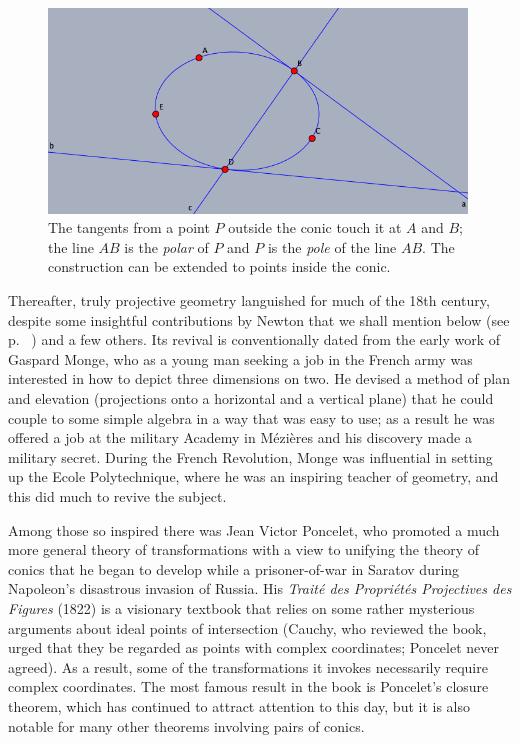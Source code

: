 \bigskip
\begin{center}
    \begin{figure}
   \begin{center}  \includegraphics[width=30em]{poleandpolar.png} 
   \end{center}
     \protect \caption{The tangents from a point $P$ outside the conic touch it at $A$ and $B$; the line $AB$ is the \emph{polar} of $P$ and $P$ is the \emph{pole} of the line $AB$. The construction can be extended to points inside the conic.}
      \label{figpolepolar}
     \end{figure}
\end{center}

\bigskip 


Thereafter, truly projective geometry languished for much of the 18th century, despite some insightful contributions by Newton that we shall mention below (see p. ~\pageref{Newtonconics}) and a few others. Its revival is conventionally dated from the early work of Gaspard Monge, who as a young man seeking a job in the French army was  interested in how to depict three dimensions on two. He devised a method of plan and elevation (projections onto a horizontal and a vertical plane) that he could couple to some simple algebra in a way that was easy to use; as a result he was offered a job at the military Academy in M\'ezi\`eres and his discovery made a military secret. During the French Revolution, Monge was influential in setting up the Ecole Polytechnique, where he was an inspiring teacher of geometry, and this did much to revive the subject. 

Among those so inspired there was Jean Victor Poncelet, who promoted a much more general theory of transformations with a view to unifying the theory of conics that he began to develop while a prisoner-of-war in Saratov during Napoleon's disastrous invasion of Russia. His \emph{Trait\'e des Propri\'et\'es Projectives des Figures} (1822) is a visionary textbook that relies on some rather mysterious arguments about ideal points of intersection (Cauchy, who reviewed the book, urged that they be regarded as points with complex coordinates; Poncelet never agreed). As a result, some of the transformations it invokes necessarily require complex coordinates. The most famous result in the book is Poncelet's closure theorem, which has continued to attract attention to this day, but it is also notable for many other theorems involving pairs of conics.


